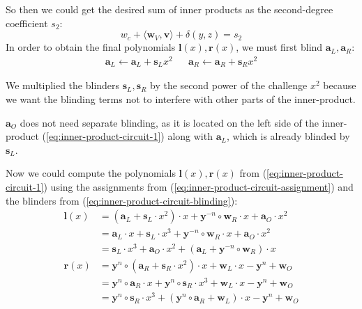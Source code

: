 \documentclass[../lecture-notes-148x210.tex]{subfiles}
\begin{document}
So then we could get the desired sum of inner products as the second-degree coefficient $s_2$:
$$ w_c + \langle \mathbf{w}_V, \mathbf{v} \rangle + \delta(y, z) = s_2$$
In order to obtain the final polynomials $\mathbf{l}(x), \mathbf{r}(x)$, we must first blind $\mathbf{a}_L, \mathbf{a}_R$:
\begin{equation}
    \begin{aligned}
    \mathbf{a}_L \gets \mathbf{a}_L + \mathbf{s}_Lx^2 && \mathbf{a}_R \gets \mathbf{a}_R + \mathbf{s}_Rx^2
    \end{aligned}
    \label{eq:inner-product-circuit-blinding}
\end{equation}
\begin{remark}
    We multiplied the blinders $\mathbf{s}_L, \mathbf{s}_R$ by the second power of the challenge $x^2$ because we want the blinding terms not to interfere with other parts of the inner-product.

    $\mathbf{a}_O$ does not need separate blinding, as it is located on the left side of the inner-product (\ref{eq:inner-product-circuit-1}) along with $\mathbf{a}_L$, which is already blinded by $\mathbf{s}_L$.
\end{remark}

Now we could compute the polynomials $\mathbf{l}(x), \mathbf{r}(x)$ from (\ref{eq:inner-product-circuit-1}) using the assignments from (\ref{eq:inner-product-circuit-assignment}) and the blinders from (\ref{eq:inner-product-circuit-blinding}):
\begin{equation}
    \begin{aligned}
        {\mathbf{l}}(x) &= (\mathbf{a}_L + \mathbf{s}_L \cdot x^2) \cdot x + \mathbf{y}^{-n} \circ \mathbf{w}_R \cdot x + \mathbf{a}_O \cdot x^2 \\
                  &= \mathbf{a}_L \cdot x + \mathbf{s}_L \cdot x^3 + \mathbf{y}^{-n} \circ \mathbf{w}_R \cdot x + \mathbf{a}_O \cdot x^2 \\
                  &= \mathbf{s}_L \cdot x^3 + \mathbf{a}_O \cdot x^2 + (\mathbf{a}_L + \mathbf{y}^{-n} \circ \mathbf{w}_R) \cdot x \\
        {\mathbf{r}}(x) &= \mathbf{y}^n \circ (\mathbf{a}_R + \mathbf{s}_R \cdot x^2) \cdot x + \mathbf{w}_L \cdot x - \mathbf{y}^n + \mathbf{w}_O \\
                  &= \mathbf{y}^n \circ \mathbf{a}_R \cdot x + \mathbf{y}^n \circ \mathbf{s}_R \cdot x^3 + \mathbf{w}_L \cdot x - \mathbf{y}^n + \mathbf{w}_O \\
                  &= \mathbf{y}^n \circ \mathbf{s}_R \cdot x^3 + (\mathbf{y}^n \circ \mathbf{a}_R +  \mathbf{w}_L) \cdot x - \mathbf{y}^n + \mathbf{w}_O
    \end{aligned}
    \label{eq:inner-product-circuit-polynomials}
\end{equation}
\end{document}
